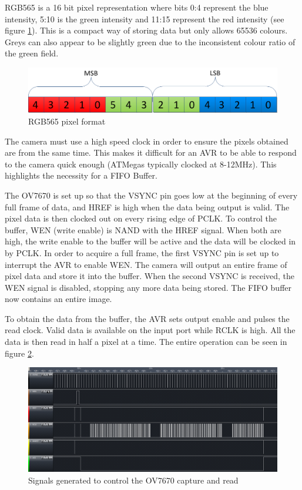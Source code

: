 RGB565 is a 16 bit pixel representation where bits 0:4 represent the blue intensity, 5:10 is the green intensity and 11:15 represent the red intensity (see figure \ref{fig:RGB565}). This is a compact way of storing data but only allows 65536 colours. Greys can also appear to be slightly green due to the inconsistent colour ratio of the green field. 
\begin{figure}
\includegraphics[width = \textwidth]{./Figures/RGB565.png}
\caption{RGB565 pixel format}
\label{fig:RGB565}
\end{figure}

The camera must use a high speed clock in order to ensure the pixels obtained are from the same time. This makes it difficult for an AVR to be able to respond to the camera quick enough (ATMegas typically clocked at 8-12MHz). This highlights the necessity for a FIFO Buffer. 

The OV7670 is set up so that the VSYNC pin goes low at the beginning of every full frame of data, and HREF is high when the data being output is valid. The pixel data is then clocked out on every rising edge of PCLK. To control the buffer, WEN (write enable) is NAND with the HREF signal. When both are high, the write enable to the buffer will be active and the data will be clocked in by PCLK. In order to acquire a full frame, the first VSYNC pin is set up to interrupt the AVR to enable WEN. The camera will output an entire frame of pixel data and store it into the buffer. When the second VSYNC is received, the WEN signal is disabled, stopping any more data being stored. The FIFO buffer now contains an entire image.

To obtain the data from the buffer, the AVR sets output enable and pulses the read clock. Valid data is available on the input port while RCLK is high. All the data is then read in half a pixel at a time. The entire operation can be seen in figure \ref{fig:ov_Capture}.
\begin{figure}
\includegraphics[width = \textwidth]{./Figures/ov7670_im_capture.png}
\caption{Signals generated to control the OV7670 capture and read}
\label{fig:ov_Capture}
\end{figure}


